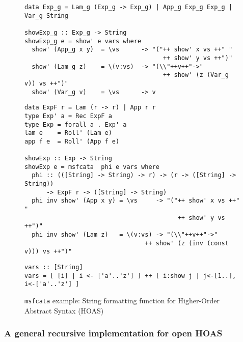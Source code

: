 \begin{figure}
\begin{verbatim}
data Exp_g = Lam_g (Exp_g -> Exp_g) | App_g Exp_g Exp_g | Var_g String

showExp_g :: Exp_g -> String
showExp_g e = show' e vars where
  show' (App_g x y)  = \vs      -> "("++ show' x vs ++" "
                                      ++ show' y vs ++")"
  show' (Lam_g z)    = \(v:vs)  -> "(\\"++v++"->"
                                      ++ show' (z (Var_g v)) vs ++")"
  show' (Var_g v)    = \vs      -> v
\end{verbatim}
\begin{verbatim}
data ExpF r = Lam (r -> r) | App r r
type Exp' a = Rec ExpF a
type Exp = forall a . Exp' a
lam e    = Roll' (Lam e)
app f e  = Roll' (App f e)

showExp :: Exp -> String
showExp e = msfcata  phi e vars where
  phi :: (([String] -> String) -> r) -> (r -> ([String] -> String))
      -> ExpF r -> ([String] -> String)
  phi inv show' (App x y) = \vs     -> "("++ show' x vs ++" "
                                          ++ show' y vs ++")"
  phi inv show' (Lam z)   = \(v:vs) -> "(\\"++v++"->"
                                 ++ show' (z (inv (const v))) vs ++")"
\end{verbatim}
\begin{verbatim}
vars :: [String]
vars = [ [i] | i <- ['a'..'z'] ] ++ [ i:show j | j<-[1..], i<-['a'..'z'] ]
\end{verbatim}
\caption{\texttt{msfcata} example: String formatting function for Higher-Order Abstract Syntax (HOAS)}
\label{fig:HOASshow}
\end{figure}

\subsubsection{A general recursive implementation for open HOAS}
\label{sec:bg:showHOAS:recursive}

